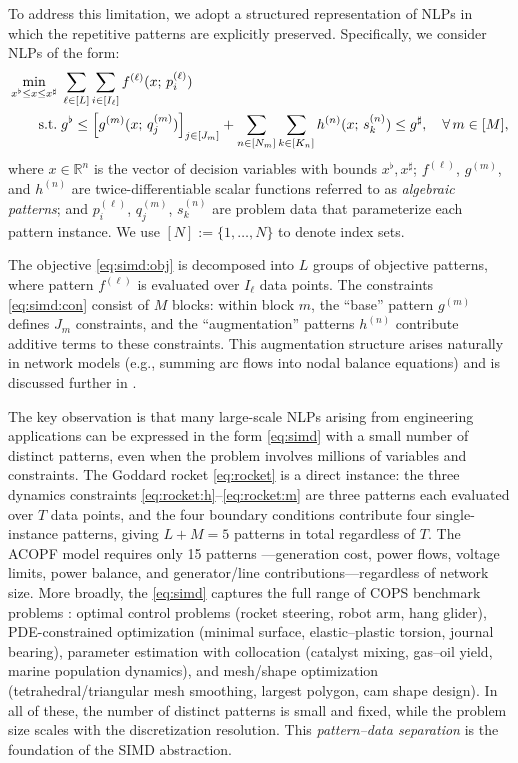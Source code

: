 \documentclass[11pt]{article}
\begin{document}
To address this limitation, we adopt a structured representation of NLPs in which the repetitive patterns are explicitly preserved. Specifically, we consider NLPs of the form:
\begin{subequations}\label{eq:simd}
\begin{align}
  \min_{x^\flat \leq x \leq x^\sharp}\;
  & \sum_{\ell \in [L]} \sum_{i \in [I_\ell]} f^{(\ell)}(x;\, p_i^{(\ell)}) \label{eq:simd:obj}\\
  \mathop{\text{\normalfont s.t.}}\; & g^\flat \leq
  \left[ g^{(m)}(x;\, q_j^{(m)}) \right]_{j \in [J_m]}
  + \sum_{n \in [N_m]} \sum_{k \in [K_n]} h^{(n)}(x;\, s_k^{(n)})
  \leq g^\sharp,
  \quad \forall\, m \in [M], \label{eq:simd:con}
\end{align}
\end{subequations}
where $x \in \mathbb{R}^{n}$ is the vector of decision variables with bounds $x^\flat, x^\sharp$; $f^{(\ell)}$, $g^{(m)}$, and $h^{(n)}$ are twice-differentiable scalar functions referred to as \emph{algebraic patterns}; and $p_i^{(\ell)}$, $q_j^{(m)}$, $s_k^{(n)}$ are problem data that parameterize each pattern instance. We use $[N] := \{1,\ldots,N\}$ to denote index sets.

The objective \cref{eq:simd:obj} is decomposed into $L$ groups of objective patterns, where pattern $f^{(\ell)}$ is evaluated over $I_\ell$ data points. The constraints \cref{eq:simd:con} consist of $M$ blocks: within block $m$, the ``base'' pattern $g^{(m)}$ defines $J_m$ constraints, and the ``augmentation'' patterns $h^{(n)}$ contribute additive terms to these constraints. This augmentation structure arises naturally in network models (e.g., summing arc flows into nodal balance equations) and is discussed further in .

The key observation is that many large-scale NLPs arising from engineering applications can be expressed in the form \cref{eq:simd} with a small number of distinct patterns, even when the problem involves millions of variables and constraints. The Goddard rocket \cref{eq:rocket} is a direct instance: the three dynamics constraints \cref{eq:rocket:h}--\cref{eq:rocket:m} are three patterns each evaluated over $T$ data points, and the four boundary conditions contribute four single-instance patterns, giving $L + M = 5$ patterns in total regardless of $T$. The ACOPF model requires only 15 patterns \citep{shinAcceleratingOptimalPower2024}---generation cost, power flows, voltage limits, power balance, and generator/line contributions---regardless of network size. More broadly, the \cref{eq:simd} captures the full range of COPS benchmark problems \citep{dolanBenchmarkingOptimizationSoftware2001}: optimal control problems (rocket steering, robot arm, hang glider), PDE-constrained optimization (minimal surface, elastic--plastic torsion, journal bearing), parameter estimation with collocation (catalyst mixing, gas--oil yield, marine population dynamics), and mesh/shape optimization (tetrahedral/triangular mesh smoothing, largest polygon, cam shape design). In all of these, the number of distinct patterns is small and fixed, while the problem size scales with the discretization resolution. This \emph{pattern--data separation} is the foundation of the SIMD abstraction.
\end{document}
